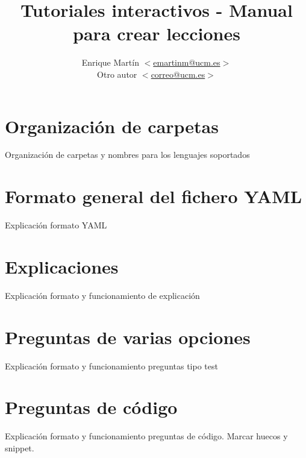 \documentclass[]{article}
\title{Tutoriales interactivos - Manual para crear lecciones}
\author{Enrique Martín $<$\url{emartinm@ucm.es}$>$ \\ Otro autor $<$\url{correo@ucm.es}$>$\\}
\begin{document}
\maketitle

\section{Organización de carpetas}
Organización de carpetas y nombres para los lenguajes soportados

\section{Formato general del fichero YAML}
Explicación formato YAML

\section{Explicaciones}
Explicación formato y funcionamiento de explicación

\section{Preguntas de varias opciones}
Explicación formato y funcionamiento preguntas tipo test

\section{Preguntas de código}
Explicación formato y funcionamiento preguntas de código. Marcar huecos y snippet.
\end{document}
